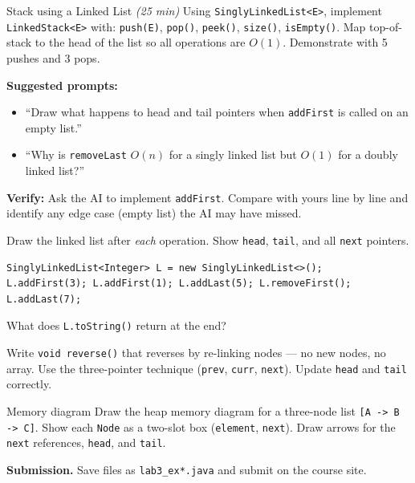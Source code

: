\documentclass[11pt]{article}
\begin{document}
\begin{labexercise}{Stack using a Linked List \hfill {\small \itshape (25 min)}}
Using \texttt{SinglyLinkedList<E>}, implement \texttt{LinkedStack<E>} with:
\texttt{push(E)}, \texttt{pop()}, \texttt{peek()}, \texttt{size()}, \texttt{isEmpty()}.
Map top-of-stack to the head of the list so all operations are $O(1)$.
Demonstrate with 5 pushes and 3 pops.
\end{labexercise}

\begin{aicollab}
\textbf{Suggested prompts:}
\begin{itemize}[leftmargin=*,nosep]
  \item ``Draw what happens to head and tail pointers when \texttt{addFirst} is called on an empty list.''
  \item ``Why is \texttt{removeLast} $O(n)$ for a singly linked list but $O(1)$ for a doubly linked list?''
\end{itemize}
\medskip\textbf{Verify:} Ask the AI to implement \texttt{addFirst}. Compare with yours line by line
and identify any edge case (empty list) the AI may have missed.
\end{aicollab}

\takehomebanner

\begin{trace}
Draw the linked list after \emph{each} operation. Show \texttt{head}, \texttt{tail}, and all \texttt{next} pointers.
\begin{lstlisting}
SinglyLinkedList<Integer> L = new SinglyLinkedList<>();
L.addFirst(3); L.addFirst(1); L.addLast(5); L.removeFirst(); L.addLast(7);
\end{lstlisting}
What does \texttt{L.toString()} return at the end?
\end{trace}

\begin{writecode}
Write \texttt{void reverse()} that reverses by re-linking nodes --- no new nodes, no array.
Use the three-pointer technique (\texttt{prev}, \texttt{curr}, \texttt{next}).
Update \texttt{head} and \texttt{tail} correctly.
\end{writecode}

\begin{drawex}{Memory diagram}
Draw the heap memory diagram for a three-node list \texttt{[A -> B -> C]}.
Show each \texttt{Node} as a two-slot box (\texttt{element}, \texttt{next}).
Draw arrows for the \texttt{next} references, \texttt{head}, and \texttt{tail}.
\end{drawex}

\vspace{4pt}
\noindent\textbf{Submission.} Save files as \texttt{lab3\_ex*.java} and submit on the course site.
\end{document}
